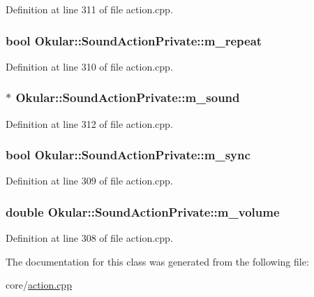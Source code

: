 Definition at line 311 of file action.\+cpp.

\hypertarget{classOkular_1_1SoundActionPrivate_a19b8db0cb7ad6c132b8287294de70b32}{
\subsubsection[{m\+\_\+repeat}]{\setlength{\rightskip}{0pt plus 5cm}bool Okular\+::\+Sound\+Action\+Private\+::m\+\_\+repeat}}\label{classOkular_1_1SoundActionPrivate_a19b8db0cb7ad6c132b8287294de70b32}


Definition at line 310 of file action.\+cpp.

\hypertarget{classOkular_1_1SoundActionPrivate_a8e5f8737f78be5852224dafabd0ba1a1}{
\subsubsection[{m\+\_\+sound}]{$\ast$ Okular\+::\+Sound\+Action\+Private\+::m\+\_\+sound}}\label{classOkular_1_1SoundActionPrivate_a8e5f8737f78be5852224dafabd0ba1a1}


Definition at line 312 of file action.\+cpp.

\hypertarget{classOkular_1_1SoundActionPrivate_ab25affe21a1da956293de62161eea3a5}{
\subsubsection[{m\+\_\+sync}]{\setlength{\rightskip}{0pt plus 5cm}bool Okular\+::\+Sound\+Action\+Private\+::m\+\_\+sync}}\label{classOkular_1_1SoundActionPrivate_ab25affe21a1da956293de62161eea3a5}


Definition at line 309 of file action.\+cpp.

\hypertarget{classOkular_1_1SoundActionPrivate_a6414b8a4f1f8f3211445210c2ced6d7e}{
\subsubsection[{m\+\_\+volume}]{\setlength{\rightskip}{0pt plus 5cm}double Okular\+::\+Sound\+Action\+Private\+::m\+\_\+volume}}\label{classOkular_1_1SoundActionPrivate_a6414b8a4f1f8f3211445210c2ced6d7e}


Definition at line 308 of file action.\+cpp.



The documentation for this class was generated from the following file\+:\begin{DoxyCompactItemize}
\item 
core/\hyperlink{action_8cpp}{action.\+cpp}\end{DoxyCompactItemize}
